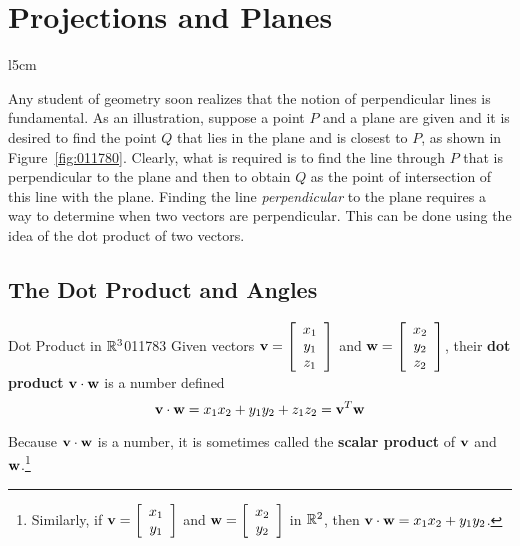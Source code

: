 \section{Projections and Planes}
\label{sec:4_2}

\begin{wrapfigure}[9]{l}{5cm} 
\centering

\caption{\label{fig:011780}}
\end{wrapfigure}

Any
 student of geometry soon realizes that the notion of perpendicular 
lines is fundamental. As an illustration, suppose a point $P$ and a plane are given and it is desired to find the point $Q$ that lies in the plane and is closest to $P$, as shown in Figure~\ref{fig:011780}. Clearly, what is required is to find the line through $P$ that is perpendicular to the plane and then to obtain $Q$ as the point of intersection of this line with the plane. Finding the line \textit{perpendicular} to the plane requires a way to determine when two vectors are perpendicular. This can be done using the idea of the dot product of two  vectors.


\subsection*{The Dot Product and Angles}

\begin{definition}{Dot Product in $\mathbb{R}^3$}{011783}
Given vectors
$\textbf{v} = \left[
\begin{array}{c}
x_{1} \\
y_{1}\\
z_{1} 
\end{array} \right]$
 and 
$\textbf{w} = \left[
\begin{array}{c}
x_{2} \\
y_{2}\\
z_{2} 
\end{array} \right]$, their \textbf{dot product} $\textbf{v} \cdot \textbf{w}$ is a number defined
\begin{equation*}
\textbf{v} \cdot \textbf{w} = x_{1}x_{2} + y_{1}y_{2} + z_{1}z_{2} = \textbf{v}^T\textbf{w}
\end{equation*}
\end{definition}

\noindent Because $\textbf{v} \cdot \textbf{w}$ is a number, it is sometimes called the \textbf{scalar product} of $\textbf{v}$ and $\textbf{w}$.\footnote{Similarly, if 
	$\textbf{v} = \left[
	\begin{array}{c}
	x_{1} \\
	y_{1}
	\end{array} \right]$
 and 
 $\textbf{w} = \left[
 \begin{array}{c}
 x_{2} \\
 y_{2} 
 \end{array} \right]$
 in $\mathbb{R}^2$, then $\textbf{v} \cdot \textbf{w} = x_{1}x_{2} + y_{1}y_{2}$.}


